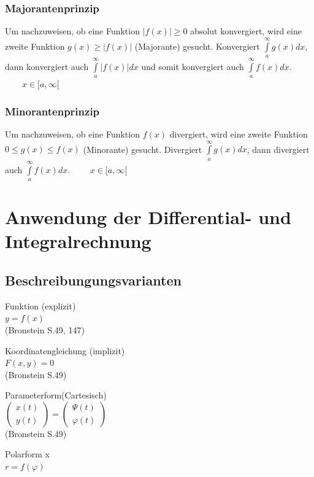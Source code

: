 \subsubsection{Majorantenprinzip}
	Um nachzuweisen, ob eine Funktion $|f(x)| \geq 0$ absolut konvergiert, wird eine zweite
	Funktion $g(x) \geq |f(x)|$ (Majorante) gesucht. Konvergiert $\int\limits_a^{\infty} g(x) dx$,
	dann konvergiert auch $\int\limits_a^{\infty} |f(x)| dx$ und somit konvergiert auch $\int\limits_a^{\infty} f(x) dx$. $\qquad x \in [a, \infty[$

\subsubsection{Minorantenprinzip}
	Um nachzuweisen, ob eine Funktion $f(x)$ divergiert, wird eine zweite
	Funktion $0 \leq g(x) \leq f(x)$ (Minorante) gesucht. Divergiert
	$\int\limits_a^{\infty} g(x) dx$,
	dann divergiert auch $\int\limits_a^{\infty} f(x) dx$. $\qquad x \in [a, \infty[$
	

\section{Anwendung der Differential- und Integralrechnung}

\subsection{Beschreibungungsvarianten}
	\begin{minipage}[t]{3.5cm}
		Funktion (explizit) \\
		$ y = f(x)$ \\
        \tiny{(Bronstein S.49, 147)}
	\end{minipage}
	\begin{minipage}[t]{6cm} 		
		Koordinatengleichung (implizit) \\
		$ F(x,y) = 0 $ \\
        \tiny{(Bronstein S.49)}
	\end{minipage}
	\begin{minipage}[t]{5.5cm} 		
		Parameterform(Cartesisch) \\
		$ \left( \begin{array} {l} x(t) \\ y(t) \end{array} \right) =
          \left( \begin{array} {l} \Psi(t) \\ \varphi(t) \end{array} \right)$\\
        \tiny{(Bronstein S.49)}
	\end{minipage} 
	\begin{minipage}[t]{3cm}
    	Polarform x\\
    	$ r=f(\varphi) $ \\
    \end{minipage}\\

